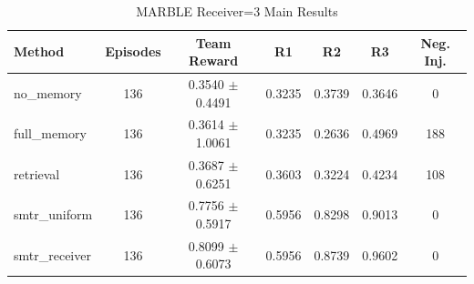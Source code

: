 \begin{table}[t]
\caption{MARBLE Receiver=3 Main Results}
\label{tab:receiver3_main}
\centering
\begin{tabular}{l c c c c c c}
\toprule
Method & Episodes & Team Reward & R1 & R2 & R3 & Neg. Inj. \\
\midrule
no\_memory & 136 & 0.3540 $\pm$ 0.4491 & 0.3235 & 0.3739 & 0.3646 & 0 \\
full\_memory & 136 & 0.3614 $\pm$ 1.0061 & 0.3235 & 0.2636 & 0.4969 & 188 \\
retrieval & 136 & 0.3687 $\pm$ 0.6251 & 0.3603 & 0.3224 & 0.4234 & 108 \\
smtr\_uniform & 136 & 0.7756 $\pm$ 0.5917 & 0.5956 & 0.8298 & 0.9013 & 0 \\
smtr\_receiver & 136 & 0.8099 $\pm$ 0.6073 & 0.5956 & 0.8739 & 0.9602 & 0 \\
\bottomrule
\end{tabular}
\end{table}